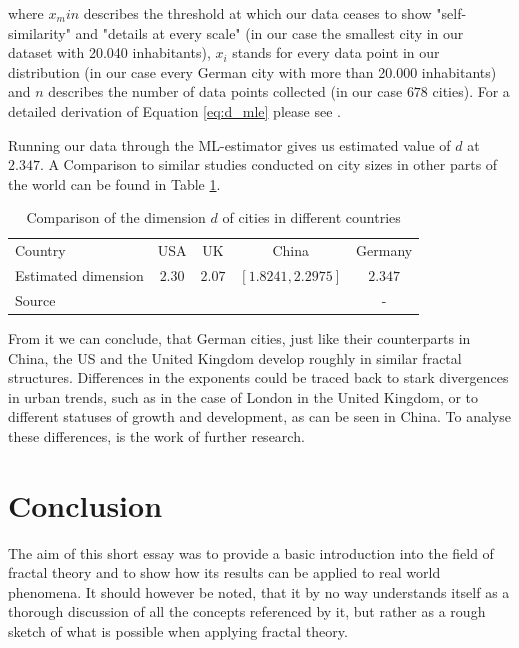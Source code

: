\documentclass{article}[12pt]
\begin{document}
where $x_min$ describes the threshold at which our data ceases to show "self-similarity" and "details at every scale" (in our case the smallest city in our dataset with 20.040 inhabitants), $x_i$ stands for every data point in our distribution (in our case every German city with more than 20.000 inhabitants) and $n$ describes the number of data points collected (in our case $678$ cities). For a detailed derivation of Equation \ref{eq:d_mle} please see \cite{newman2005power}.

Running our data through the ML-estimator gives us estimated value of $d$ at $2.347$. A Comparison to similar studies conducted on city sizes in other parts of the world can be found in Table \ref{table:box_const}.

\begin{table}[!ht]
\begin{tabular}{p{1.75cm}cccc}
&\\
\hline
\hline
Country & USA & UK & China & Germany \\[2.5ex]
\hline
Estimated \newline dimension & $2.30$ & $2.07$ & $[1.8241, 2.2975]$ & $2.347$
\\[2.5ex]
Source & \scriptsize \cite{ newman2005power} & \scriptsize \cite{arcaute2015constructing} & \scriptsize \cite{ gangopadhyay2009city} & -\\[2.5ex]
\hline
\hline
\end{tabular}
\caption{Comparison of the dimension $d$ of cities in different countries}
\label{table:box_const}
\end{table}


From it we can conclude, that German cities, just like their counterparts in China, the US and the United Kingdom develop roughly in similar fractal structures. Differences in the exponents could be traced back to stark divergences in urban trends, such as in the case of London in the United Kingdom, or to different statuses of growth and development, as can be seen in China. To analyse these differences, is the work of further research.

\section{Conclusion}

The aim of this short essay was to provide a basic introduction into the field of fractal theory and to show how its results can be applied to real world phenomena. It should however be noted, that it by no way understands itself as a thorough discussion of all the concepts referenced by it, but rather as a rough sketch of what is possible when applying fractal theory.
\end{document}
